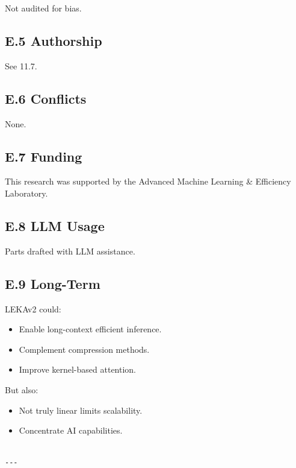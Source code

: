 Not audited for bias.

\subsection{E.5 Authorship}

See  11.7.

\subsection{E.6 Conflicts}

None.

\subsection{E.7 Funding}

This research was supported by the Advanced Machine Learning \& Efficiency Laboratory.

\subsection{E.8 LLM Usage}

Parts drafted with LLM assistance.

\subsection{E.9 Long-Term}

LEKAv2 could:
\begin{itemize}
\item Enable long-context efficient inference.
\item Complement compression methods.
\item Improve kernel-based attention.

\end{itemize}
But also:
\begin{itemize}
\item Not truly linear limits scalability.
\item Concentrate AI capabilities.
\end{itemize}
\begin{lstlisting}

---
\end{lstlisting}